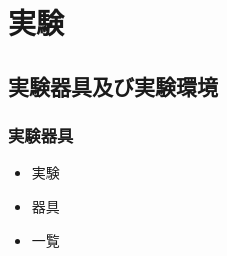 \documentclass[a4paper, book, twoside, openany, fontsize = 11pt, gutter = 3cm]{jlreq}
\begin{document}
		\chapter{実験} \label{chap:experiment}
			\section{実験器具及び実験環境}
				\subsection{実験器具}
					\begin{itemize}
						\item 実験
						\item 器具
						\item 一覧
					\end{itemize}

\end{document}
